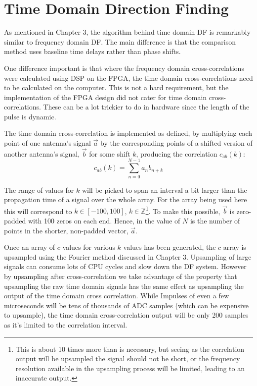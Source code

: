 \section{Time Domain Direction Finding}

As mentioned in Chapter 3, the algorithm behind time domain DF is remarkably similar to frequency domain DF. The main difference is that the comparison method uses baseline time delays rather than phase shifts. 

One difference important is that where the frequency domain cross-correlations were calculated using DSP on the FPGA, the time domain cross-correlations need to be calculated on the computer. This is not a hard requirement, but the implementation of the FPGA design did not cater for time domain cross-correlations. These can be a lot trickier to do in hardware since the length of the pulse is dynamic.

The time domain cross-correlation is implemented as defined, by multiplying each point of one antenna's signal \(\vec{a}\) by the corresponding points of a shifted version of another antenna's signal, \(\vec{b}\) for some shift \(k\), producing the correlation \(c_{ab}(k)\):
\begin{equation} \label{eq:software:time-domain-cross-correlation}
  c_{ab}(k) = \sum_{n = 0}^{N-1} a_{n} b_{n+k}
\end{equation}

The range of values for \(k\) will be picked to span an interval a bit larger than the propagation time of a signal over the whole array. For the array being used here this will correspond to \(k\in [-100, 100]\), \(k\in \mathbb{Z}\)\footnote{This is about 10 times more than is necessary, but seeing as the correlation output will be upsampled the signal should not be short, or the frequency resolution available in the upsampling process will be limited, leading to an inaccurate output.}. To make this possible, \(\vec{b}\) is zero-padded with 100 zeros on each end. Hence, in  the value of \(N\) is the number of points in the shorter, non-padded vector, \(\vec{a}\).

Once an array of \(c\) values for various \(k\) values has been generated, the \(c\) array is upsampled using the Fourier method discussed in Chapter 3.  Upsampling of large signals can consume lots of CPU cycles and slow down the DF system. However by upsampling after cross-correlation we take advantage of the property that upsampling the raw time domain signals has the same effect as upsampling the output of the time domain cross correlation. While Impulses of even a few microseconds will be tens of thousands of ADC samples (which can be expensive to upsample), the time domain cross-correlation output will be only 200 samples as it's limited to the correlation interval. 

